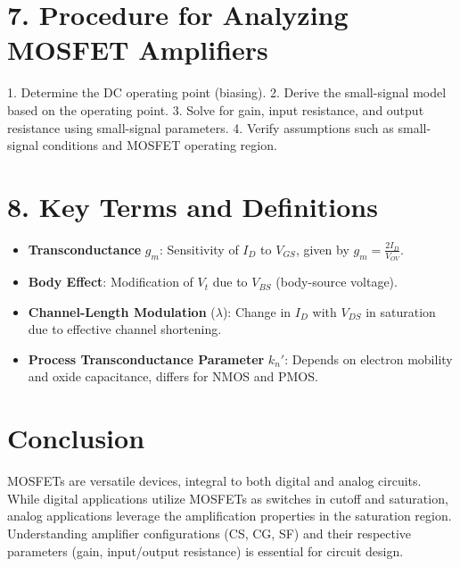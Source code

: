 \documentclass[10pt]{article}
\begin{document}
\begin{multicols}{2}
\section*{7. Procedure for Analyzing MOSFET Amplifiers}
1. Determine the DC operating point (biasing).
2. Derive the small-signal model based on the operating point.
3. Solve for gain, input resistance, and output resistance using small-signal parameters.
4. Verify assumptions such as small-signal conditions and MOSFET operating region.

\section*{8. Key Terms and Definitions}
\begin{itemize}[noitemsep]
    \item \textbf{Transconductance} \(g_m\): Sensitivity of \(I_D\) to \(V_{GS}\), given by \(g_m = \frac{2 I_D}{V_{OV}}\).
    \item \textbf{Body Effect}: Modification of \(V_t\) due to \(V_{BS}\) (body-source voltage).
    \item \textbf{Channel-Length Modulation} (\(\lambda\)): Change in \(I_D\) with \(V_{DS}\) in saturation due to effective channel shortening.
    \item \textbf{Process Transconductance Parameter} \(k_n'\): Depends on electron mobility and oxide capacitance, differs for NMOS and PMOS.
\end{itemize}

\section*{Conclusion}
MOSFETs are versatile devices, integral to both digital and analog circuits. While digital applications utilize MOSFETs as switches in cutoff and saturation, analog applications leverage the amplification properties in the saturation region. Understanding amplifier configurations (CS, CG, SF) and their respective parameters (gain, input/output resistance) is essential for circuit design.

\end{multicols}
\end{document}
